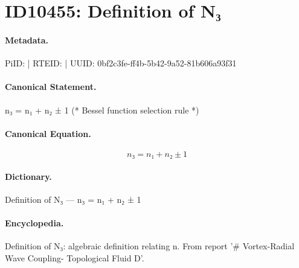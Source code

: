 \section*{ID10455: Definition of N₃}
\paragraph{Metadata.}
PiID:  | RTEID:  | UUID: 0bf2c3fe-ff4b-5b42-9a52-81b606a93f31

\paragraph{Canonical Statement.}
n₃ = n₁ + n₂ ± 1 (* Bessel function selection rule *)

\paragraph{Canonical Equation.}
\[
n₃ = n₁ + n₂ ± 1
\]

\paragraph{Dictionary.}
Definition of N₃ — n₃ = n₁ + n₂ ± 1

\paragraph{Encyclopedia.}
Definition of N₃: algebraic definition relating n. From report '\# Vortex-Radial Wave Coupling- Topological Fluid D'.
